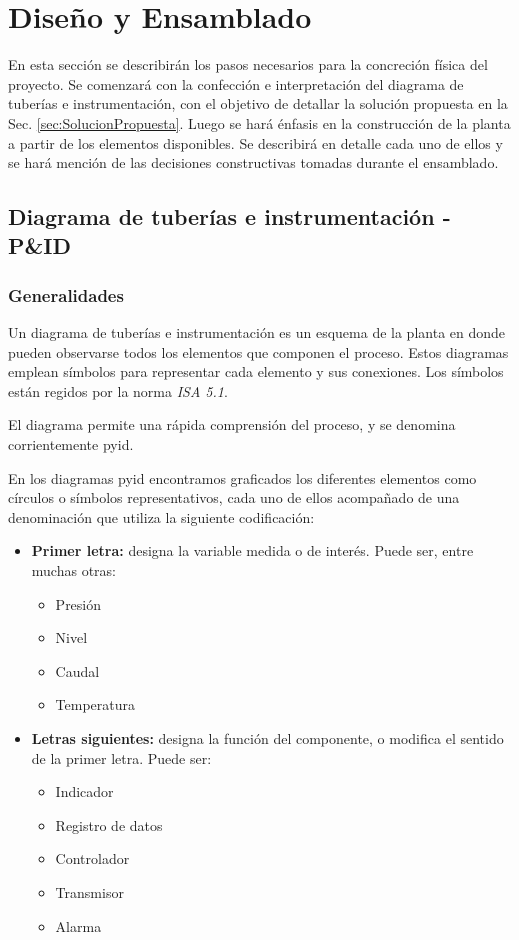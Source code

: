\chapter{Diseño y Ensamblado}
\label{ch:DisenoEnsamblado}

En esta sección se describirán los pasos necesarios para la concreción física
del proyecto.
Se comenzará con la confección e interpretación del diagrama de tuberías e
instrumentación, con el objetivo de detallar la solución propuesta en
la Sec. \ref{sec:SolucionPropuesta}.
Luego se hará énfasis en la construcción de la planta a partir de los elementos
disponibles.
Se describirá en detalle cada uno de ellos y se hará mención de
las decisiones constructivas tomadas durante el ensamblado.

\section{Diagrama de tuberías e instrumentación - P\&ID}
\label{sec:p&id}

\subsection{Generalidades}
Un diagrama de tuberías e instrumentación es un esquema de la planta en donde
pueden observarse todos los elementos que componen el proceso.
Estos diagramas emplean símbolos para representar cada elemento y sus
conexiones.
Los símbolos están regidos por la norma
\emph{ISA 5.1}.

El diagrama permite una rápida comprensión del proceso, y se denomina
corrientemente \gls{pyid}.

En los diagramas \gls{pyid} encontramos graficados los diferentes elementos
como círculos o símbolos representativos, cada uno de ellos acompañado de una
denominación que utiliza la siguiente codificación:

\begin{itemize}  
 \item \textbf{Primer letra:}
 designa la variable medida o de interés. Puede ser, entre muchas otras:
 \begin{itemize}
  \item Presión
  \item Nivel
  \item Caudal
  \item Temperatura
 \end{itemize}

 \item \textbf{Letras siguientes:}
 designa la función del componente, o modifica el sentido de la primer letra.
 Puede ser:
 \begin{itemize}
  \item Indicador
  \item Registro de datos
  \item Controlador
  \item Transmisor
  \item Alarma
 \end{itemize}
\end{itemize}

